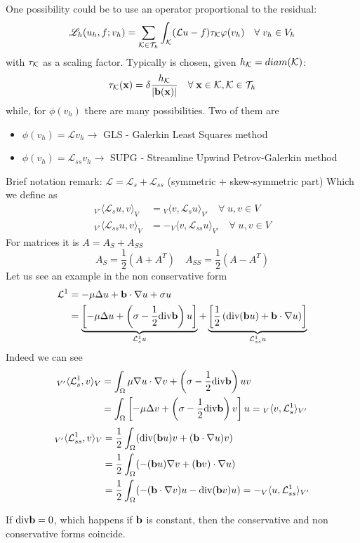 One possibility could be to use an operator proportional to the residual:
\[
    \mathscr{L}_h(u_h, f;v_h) = \sum_{\mathcal{K} \in \mathcal{T}_h} \int_{\mathcal{K}}(\mathcal{L}u - f)\tau_{\mathcal{K}} \varphi(v_h) \quad \forall \; v_h \in V_h  
\]
with \(\tau_{\mathcal{K}}\) as a scaling factor. Typically is chosen, given \(h_{\mathcal{K}} = diam(\mathcal{K})\):
\[
    \tau_{\mathcal{K}} (\textbf{x}) = \delta \frac{h_{\mathcal{K}}}{\abs{\textbf{b}(\textbf{x})}} \quad \forall \; \textbf{x} \in \mathcal{K}, \mathcal{K} \in \mathcal{T}_h
\]
while, for \(\phi(v_h)\) there are many possibilities. Two of them are 
\begin{itemize}
    \item \(\phi(v_h) = \mathcal{L}v_h \rightarrow\) GLS - Galerkin Least Squares method
    \item \(\phi(v_h) = \mathcal{L}_{ss}v_h \rightarrow\) SUPG - Streamline Upwind Petrov-Galerkin method
\end{itemize}
Brief notation remark: \(\mathcal{L} = \mathcal{L}_s +\mathcal{L}_{ss}\) (symmetric + skew-symmetric part)
Which we define as 
\begin{align*}
    {}_{V'}\langle\mathcal{L}_su, v \rangle_{V} &= {}_{V}\langle v, \mathcal{L}_su \rangle_{V'}  \quad \forall \; u, v \in V \\
    {}_{V'}\langle\mathcal{L}_{ss}u, v \rangle_V &= -{}_{V}\langle v, \mathcal{L}_{ss}u \rangle_{V'} \quad \forall \; u, v \in V 
\end{align*}
For matrices it is \(A = A_S + A_{SS}\) 
\[
  A_S = \frac{1}{2} (A + A^T) \quad A_{SS} = \frac{1}{2} (A -A^T)
\]
Let us see an example in the non conservative form 
\begin{align*}
        \mathcal{L}^1 &= -\mu \Delta u + \textbf{b} \cdot \nabla u + \sigma u \\
        &= \underbrace{\left[ -\mu \Delta u + \left( \sigma - \frac{1}{2} \text{div} \textbf{b} \right)u\right]}_{\mathcal{L}^1_s u} + \underbrace{\left[ \frac{1}{2} \left( \text{div}(\textbf{b}u) + \textbf{b} \cdot \nabla u \right) \right]}_{\mathcal{L}^1_{ss}u}
\end{align*}
Indeed we can see
\begin{align*}
    {}_{V'}\langle \mathcal{L}^1_s, v \rangle_V &= \int_\Omega \mu \nabla u \cdot \nabla v + \left( \sigma - \frac{1}{2} \text{div} \textbf{b} \right) u v \\
    &= \int_\Omega \left[ -\mu \Delta v + \left( \sigma - \frac{1}{2} \text{div} \textbf{b} \right) v \right] u = {}_{V}\langle v, \mathcal{L}^1_s \rangle_{V'}
\end{align*}
\begin{align*}
    {}_{V'}\langle \mathcal{L}^1_{ss}, v \rangle_V &= \frac{1}{2} \int_\Omega (\text{div}(\textbf{b}u)v+(\textbf{b} \cdot \nabla u)v) \\
    &= \frac{1}{2} \int_\Omega (-(\textbf{b}u) \nabla v + (\textbf{b}v) \cdot \nabla u) \\
    &= \frac{1}{2} \int_\Omega (-(\textbf{b}\cdot \nabla v)u - \text{div}(\textbf{b}v)u) = -{}_V\langle u, \mathcal{L}_{ss}^1 \rangle_{V'}
\end{align*}
\begin{remark}
    If \(\text{div} \textbf{b} = 0\), which happens if \(\textbf{b}\) is constant, then the conservative and non conservative forms coincide.
\end{remark}
